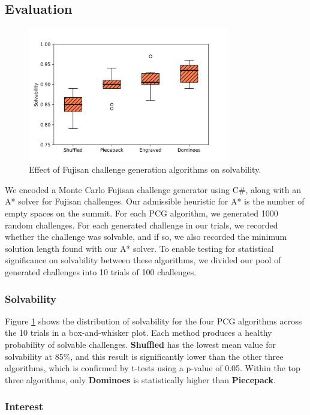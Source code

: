 \documentclass[journal]{IEEEtran}
\begin{document}
\subsection{Evaluation}

%


\begin{figure}[t]
\includegraphics[width=8.8cm]{figure16.png}
\caption{Effect of Fujisan challenge generation algorithms on solvability.}
\label{fig:strategycomp}
\end{figure}

\noindent
We encoded a Monte Carlo Fujisan challenge generator using C\#, along with an A* solver for Fujisan challenges. Our admissible heuristic for A* is the number of empty spaces on the summit. For each PCG algorithm, we generated 1000 random challenges.
For each generated challenge in our trials, we recorded whether the challenge was solvable, and if so, we also recorded the minimum solution length found with our A* solver. To enable testing for statistical significance on solvability between these algorithms, we divided our pool of generated challenges into 10 trials of 100 challenges. 
 
\subsubsection{Solvability}

Figure \ref{fig:strategycomp} shows the distribution of solvability for the four PCG algorithms across the 10 trials in a box-and-whisker plot. Each method produces a healthy probability of solvable challenges. {\bf Shuffled} has the lowest mean value for solvability at 85\%, and this result is significantly lower than the other three algorithms, which is confirmed by t-tests using a p-value of 0.05. Within the top three algorithms, only {\bf Dominoes} is statistically higher than {\bf Piecepack}. 

\subsubsection{Interest}
\end{document}
